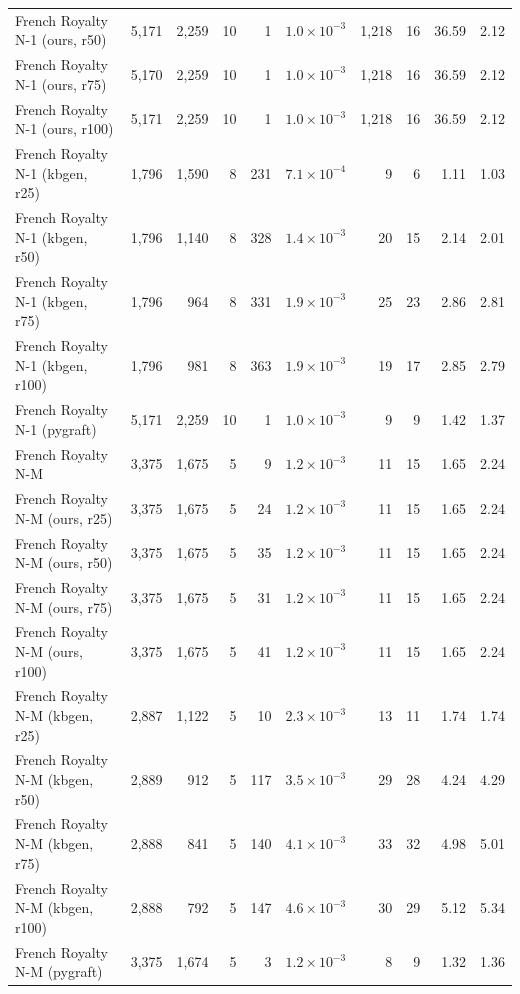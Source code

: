 \begin{tabular}{lrrrrrrrrr}
French Royalty N-1 (ours, r50) & 5{,}171 & 2{,}259 & 10 & 1 & $1.0\times10^{-3}$ & 1{,}218 & 16 & 36.59 & 2.12 \\
French Royalty N-1 (ours, r75) & 5{,}170 & 2{,}259 & 10 & 1 & $1.0\times10^{-3}$ & 1{,}218 & 16 & 36.59 & 2.12 \\
French Royalty N-1 (ours, r100) & 5{,}171 & 2{,}259 & 10 & 1 & $1.0\times10^{-3}$ & 1{,}218 & 16 & 36.59 & 2.12 \\
French Royalty N-1 (kbgen, r25) & 1{,}796 & 1{,}590 & 8 & 231 & $7.1\times10^{-4}$ & 9 & 6 & 1.11 & 1.03 \\
French Royalty N-1 (kbgen, r50) & 1{,}796 & 1{,}140 & 8 & 328 & $1.4\times10^{-3}$ & 20 & 15 & 2.14 & 2.01 \\
French Royalty N-1 (kbgen, r75) & 1{,}796 & 964 & 8 & 331 & $1.9\times10^{-3}$ & 25 & 23 & 2.86 & 2.81 \\
French Royalty N-1 (kbgen, r100) & 1{,}796 & 981 & 8 & 363 & $1.9\times10^{-3}$ & 19 & 17 & 2.85 & 2.79 \\
French Royalty N-1 (pygraft) & 5{,}171 & 2{,}259 & 10 & 1 & $1.0\times10^{-3}$ & 9 & 9 & 1.42 & 1.37 \\
\midrule
French Royalty N-M & 3{,}375 & 1{,}675 & 5 & 9 & $1.2\times10^{-3}$ & 11 & 15 & 1.65 & 2.24 \\
French Royalty N-M (ours, r25) & 3{,}375 & 1{,}675 & 5 & 24 & $1.2\times10^{-3}$ & 11 & 15 & 1.65 & 2.24 \\
French Royalty N-M (ours, r50) & 3{,}375 & 1{,}675 & 5 & 35 & $1.2\times10^{-3}$ & 11 & 15 & 1.65 & 2.24 \\
French Royalty N-M (ours, r75) & 3{,}375 & 1{,}675 & 5 & 31 & $1.2\times10^{-3}$ & 11 & 15 & 1.65 & 2.24 \\
French Royalty N-M (ours, r100) & 3{,}375 & 1{,}675 & 5 & 41 & $1.2\times10^{-3}$ & 11 & 15 & 1.65 & 2.24 \\
French Royalty N-M (kbgen, r25) & 2{,}887 & 1{,}122 & 5 & 10 & $2.3\times10^{-3}$ & 13 & 11 & 1.74 & 1.74 \\
French Royalty N-M (kbgen, r50) & 2{,}889 & 912 & 5 & 117 & $3.5\times10^{-3}$ & 29 & 28 & 4.24 & 4.29 \\
French Royalty N-M (kbgen, r75) & 2{,}888 & 841 & 5 & 140 & $4.1\times10^{-3}$ & 33 & 32 & 4.98 & 5.01 \\
French Royalty N-M (kbgen, r100) & 2{,}888 & 792 & 5 & 147 & $4.6\times10^{-3}$ & 30 & 29 & 5.12 & 5.34 \\
French Royalty N-M (pygraft) & 3{,}375 & 1{,}674 & 5 & 3 & $1.2\times10^{-3}$ & 8 & 9 & 1.32 & 1.36 \\

\end{tabular}
